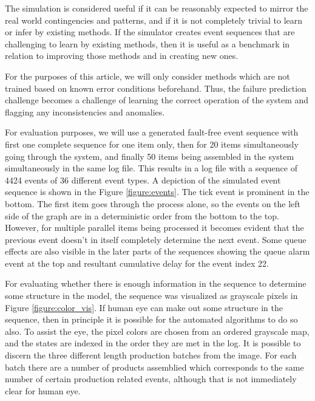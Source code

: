 \documentclass[journal]{IEEEtran}
\begin{document}
The simulation is considered useful if it can be reasonably expected to mirror the real world contingencies and patterns, and if it is not completely trivial to
learn or infer by existing methods. If the simulator creates event sequences that are challenging to learn by existing methods, then it is useful as a benchmark
in relation to improving those methods and in creating new ones.

For the purposes of this article, we will only consider methods which are not trained based on known error conditions beforehand. Thus, the failure prediction challenge
becomes a challenge of learning the correct operation of the system and flagging any inconsistencies and anomalies.

For evaluation purposes, we will use a generated fault-free event sequence with first one complete sequence for one item only, then for 20 items simultaneously going through the system,
and finally 50 items being assembled in the system simultaneously in the same log file. This results in a log file with a sequence of 4424 events of 36 different
event types. A depiction of the simulated event sequence is shown in the Figure \ref{figure:events}. The tick event is prominent in the bottom.
The first item goes through the process alone, so the events on the left side
of the graph are in a deterministic order from the bottom to the top. However, for multiple parallel items being processed it becomes evident that the previous event doesn't in itself
completely determine the next event.
Some queue effects are also visible in the later parts of the sequences showing the queue alarm event at the top and resultant cumulative delay for the event index 22.

For evaluating whether there is enough information in the sequence to determine some structure in the model, the sequence was visualized as grayscale pixels in Figure \ref{figure:color_vis}.
If human eye can make out some structure in the sequence, then in principle it is possible for the automated algorithms to do so also. To assist the eye, the pixel colors are chosen
from an ordered grayscale map, and the states are indexed in the order they are met in the log. It is possible to discern the three different length production batches from the image.
For each batch there are
a number of products assemblied which corresponds to the same number of certain production related events, although that is not immediately clear for human eye.
\end{document}

